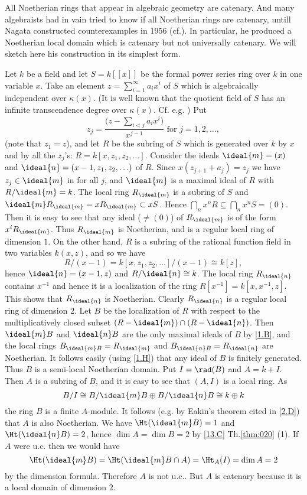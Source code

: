 \documentclass[../main]{subfiles}
\begin{document}
\begin{parexample}
All Noetherian rings that appear in algebraic geometry are catenary. And many algebraists had in vain tried to know if all Noetherian rings are catenary, untill Nagata constructed counterexamples in 1956 (cf.\cite[p.203, Example 2]{nagata1975local}). In particular, he produced a Noetherian local domain which is catenary but not universally catenary. We will sketch here his construction in its simplest form.

Let $k$ be a field and let $S=k[[x]]$ be the formal power series ring over $k$ in one variable $x$. Take an element $z=\sum_{i=1}^\infty a_i x^i$ of $S$ which is algebraically independent over $\kappa(x)$. (It is well known that the quotient field of $S$ has an infinite transcendence degree over $\kappa(x)$. Cf. e.g. \cite[Commutative Algebra, Vo1.II, p.220.]{zariski2014commutative}) Put 
\[z_j=\dfrac{\bigg(z-\displaystyle \sum_{i<j} a_i x^i\bigg)}{x^{j-1}} \text{ for } j=1,2, \ldots,\] (note that $z_1=z$), and let $R$ be the subring of $S$ which is generated over $k$ by $x$ and by all the $z_j$'s: $R=k[x, z_1, z_2, \ldots]$. Consider the ideals $\ideal{m}=(x)$ and $\ideal{n}=(x-1, z_1, z_2, \ldots)$ of $R$. Since $x(z_{j+1}+a_j)=z_j$ we have $z_j \in\ideal{m}$ in for all $j$, and $\ideal{m}$ is a maximal ideal of $R$ with $R /\ideal{m}=k$. The local ring $R_{\ideal{m}}$ is a subring of $S$ and $\ideal{m}R_{\ideal{m}}=xR_{\ideal{m}}\subset xS$. Hence $\bigcap_nx^nR\subseteq\bigcap_nx^nS=(0)$. Then it is easy to see that any ideal ($\neq (0)$) of $R_{\ideal{m}}$ is of the form $x^iR_{\ideal{m}}$. Thus $R_{\ideal{m}}$ is Noetherian, and is a regular local ring of dimension $1$. On the other hand, $R$ is a subring of the rational function field in two variables $k(x,z)$, and so we have \[R/(x-1) = k[x,z_1,z_2,\ldots]/(x-1)\cong k[z],\] hence $\ideal{n}=(x-1, z)$ and $R/\ideal{n}\cong k$. The local ring $R_{\ideal{n}}$ contains $x^{-1}$ and hence it is a localization of the ring $R[x^{-1}] = k[x,x^{-1},z]$. This shows that $R_{\ideal{n}}$ is Noetherian. Clearly $R_{\ideal{n}}$ is a regular local ring of dimension $2$. Let $B$ be the localization of $R$ with respect to the multiplicatively closed subset $(R-\ideal{m})\cap(R-\ideal{n})$. Then $\ideal{m}B$ and $\ideal{n}B$ are the only maximal ideals of $B$ by \ref{1.B}, and the local rings $B_{\ideal{m}B} = R_{\ideal{m}}$ and $B_{\ideal{n}B} = R_{\ideal{n}}$ are Noetherian. It follows easily (using \ref{1.H}) that any ideal of $B$ is finitely generated. Thus $B$ is a semi-local Noetherian domain. Put $I = \rad(B)$ and $A=k+I$. Then $A$ is a subring of $B$, and it is easy to see that $(A,I)$ is a local ring. As \[B/I \cong B/\ideal{m}B \oplus B/\ideal{n}B \cong k \oplus k\] the ring $B$ is a finite $A$-module. It follows (e.g. by Eakin's theorem cited in \ref{2.D}) that $A$ is also Noetherian. We have $\Ht(\ideal{m}B) = 1$ and $\Ht(\ideal{n}B) = 2$, hence $\dim A = \dim B = 2$ by \ref{13.C} Th.\ref{thm:020} (1). If $A$ were u.c. then we would have \[\Ht(\ideal{m}B) = \Ht(\ideal{m}B\cap A)=\Ht_A(I)=\dim A = 2\] by the dimension formula. Therefore $A$ is not u.c.. But $A$ is catenary because it is a local domain of dimension $2$. 
\end{parexample}
\end{document}
